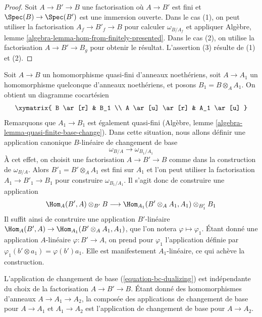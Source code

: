 \begin{proof}
Soit $A \to B' \to B$ une factorisation où $A \to B'$ est fini et
$\Spec(B) \to \Spec(B')$ est une immersion ouverte. Dans le cas (1), on peut utiliser
la factorisation $A_f \to B'_f \to B$ pour calculer $\omega_{B/A_f}$
et appliquer Algèbre, lemme \ref{algebra-lemma-hom-from-finitely-presented}.
Dans le cas (2), on utilise la factorisation $A \to B' \to B_g$ pour obtenir le résultat.
L'assertion (3) résulte de (1) et (2).
\end{proof}

\noindent
Soit $A \to B$ un homomorphisme quasi-fini d'anneaux noethériens, soit
$A \to A_1$ un homomorphisme quelconque d'anneaux noethériens, et posons
$B_1 = B \otimes_A A_1$. On obtient un diagramme cocartésien
$$
\xymatrix{
B \ar[r] & B_1 \\
A \ar[u] \ar[r] & A_1 \ar[u]
}
$$
Remarquons que $A_1 \to B_1$ est également quasi-fini (Algèbre, lemme
\ref{algebra-lemma-quasi-finite-base-change}).
Dans cette situation, nous allons définir une application canonique
$B$-linéaire de changement de base
\begin{equation}
\label{equation-bc-dualizing}
\omega_{B/A} \longrightarrow \omega_{B_1/A_1}
\end{equation}
À cet effet, on choisit une factorisation $A \to B' \to B$ comme dans la construction
de $\omega_{B/A}$. Alors $B'_1 = B' \otimes_A A_1$ est fini sur $A_1$
et l'on peut utiliser la factorisation $A_1 \to B'_1 \to B_1$ pour construire
$\omega_{B_1/A_1}$. Il s'agit donc de construire une application
$$
\Hom_A(B', A) \otimes_{B'} B
\longrightarrow
\Hom_{A_1}(B' \otimes_A A_1, A_1) \otimes_{B'_1} B_1
$$
Il suffit ainsi de construire une application $B'$-linéaire\newline
$\Hom_A(B', A) \to \Hom_{A_1}(B' \otimes_A A_1, A_1)$,
que l'on notera $\varphi \mapsto \varphi_1$.
Étant donné une application $A$-linéaire $\varphi : B' \to A$,
on prend pour $\varphi_1$ l'application définie par
$\varphi_1(b' \otimes a_1) = \varphi(b')a_1$.
Elle est manifestement $A_1$-linéaire, ce qui achève la construction.

\begin{lemma}
\label{lemma-bc-map-dualizing}
L'application de changement de base (\ref{equation-bc-dualizing})
est indépendante du choix de la
factorisation $A \to B' \to B$. Étant donné des homomorphismes d'anneaux $A \to A_1 \to A_2$,
la composée des applications de changement de base pour $A \to A_1$ et $A_1 \to A_2$
est l'application de changement de base pour $A \to A_2$.
\end{lemma}

